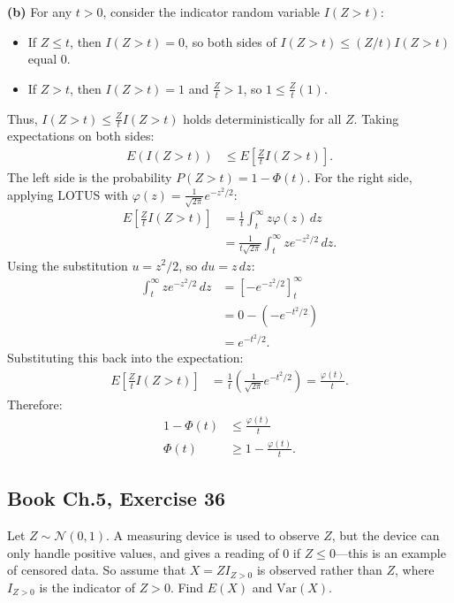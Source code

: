 \documentclass[11pt,a4paper]{article}
\begin{document}
\vspace{4pt}
\noindent \textbf{(b)} For any $t > 0$, consider the indicator random variable $I(Z > t)$:
\begin{itemize}
    \item If $Z \le t$, then $I(Z > t) = 0$, so both sides of $I(Z > t) \le (Z/t) I(Z > t)$ equal $0$.
    \item If $Z > t$, then $I(Z > t) = 1$ and $\frac{Z}{t} > 1$, so $1 \le \frac{Z}{t}(1)$.
\end{itemize}
Thus, $I(Z > t) \le \frac{Z}{t} I(Z > t)$ holds deterministically for all $Z$. Taking expectations on both sides:
\begin{align*}
E(I(Z > t)) &\le E\left[ \frac{Z}{t} I(Z > t) \right].
\end{align*}
The left side is the probability $P(Z > t) = 1 - \Phi(t)$. For the right side, applying LOTUS with $\varphi(z) = \frac{1}{\sqrt{2\pi}} e^{-z^2/2}$:
\begin{align*}
E\left[ \frac{Z}{t} I(Z > t) \right] &= \frac{1}{t} \int_{t}^{\infty} z \varphi(z) \, dz \\
&= \frac{1}{t \sqrt{2\pi}} \int_{t}^{\infty} z e^{-z^2/2} \, dz.
\end{align*}
Using the substitution $u = z^2/2$, so $du = z \, dz$:
\begin{align*}
\int_{t}^{\infty} z e^{-z^2/2} \, dz &= \left[ -e^{-z^2/2} \right]_{t}^{\infty} \\
&= 0 - \left(-e^{-t^2/2}\right) \\
&= e^{-t^2/2}.
\end{align*}
Substituting this back into the expectation:
\begin{align*}
E\left[ \frac{Z}{t} I(Z > t) \right] &= \frac{1}{t} \left( \frac{1}{\sqrt{2\pi}} e^{-t^2/2} \right) = \frac{\varphi(t)}{t}.
\end{align*}
Therefore:
\begin{align*}
1 - \Phi(t) &\le \frac{\varphi(t)}{t} \\
\Phi(t) &\ge 1 - \frac{\varphi(t)}{t}.
\end{align*}

\vspace{10pt}
\subsection{Book Ch.5, Exercise 36}
\begin{tcolorbox}[title={Book Ch.5, Exercise 36}]
Let $Z \sim \mathcal{N}(0, 1)$. A measuring device is used to observe $Z$, but the device can only handle positive values, and gives a reading of 0 if $Z \le 0$---this is an example of censored data. So assume that $X = Z I_{Z > 0}$ is observed rather than $Z$, where $I_{Z > 0}$ is the indicator of $Z > 0$. Find $E(X)$ and $\text{Var}(X)$.
\end{tcolorbox}
\end{document}
